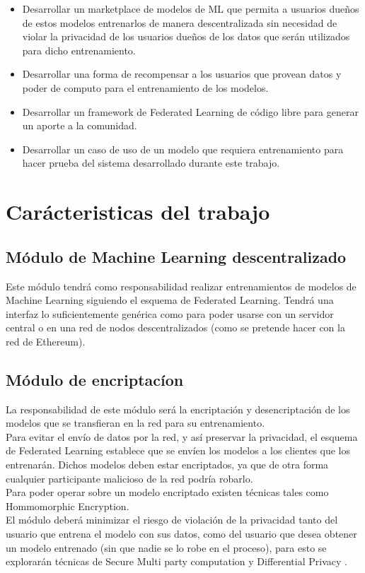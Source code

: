 \documentclass[
11pt, %
oneside, %
spanish, %
singlespacing, %
headsepline, %
chapterinoneline, %
]{MastersDoctoralThesis} %
\begin{document}
\begin{itemize}
\item Desarrollar un marketplace de modelos de ML que permita a usuarios dueños de estos modelos entrenarlos de manera descentralizada sin necesidad de violar la privacidad de los usuarios dueños de los datos que serán utilizados para dicho entrenamiento.  
\item Desarrollar una forma de recompensar a los usuarios que provean datos y poder de computo para el entrenamiento de los modelos.
\item Desarrollar un framework de Federated Learning de código libre para generar un aporte a la comunidad.
\item Desarrollar un caso de uso de un modelo que requiera entrenamiento para hacer prueba del sistema desarrollado durante este trabajo.
\end{itemize}


\chapter{Car\'acteristicas del trabajo}

\section{Módulo de Machine Learning descentralizado}
Este módulo tendrá como responsabilidad realizar entrenamientos de modelos de Machine Learning siguiendo el esquema de Federated Learning. Tendrá una interfaz lo suficientemente genérica como para poder usarse con un servidor central o en una red de nodos descentralizados (como se pretende hacer con la red de Ethereum).

\section{Módulo de encriptac\'ion}
La responsabilidad de este módulo será la encriptación y desencriptación de los modelos que se transfieran en la red para su entrenamiento. \\
Para evitar el envío de datos por la red, y así preservar la privacidad, el esquema de Federated Learning establece que se envíen los modelos a los clientes que los entrenarán.
Dichos modelos deben estar encriptados, ya que de otra forma cualquier participante malicioso de la red podría robarlo. \\
Para poder operar sobre un modelo encriptado existen técnicas tales como Hommomorphic Encryption. \\
El módulo deberá minimizar el riesgo de violación de la privacidad tanto del usuario que entrena el modelo con sus datos, como del usuario que desea obtener un modelo entrenado (sin que nadie se lo robe en el proceso), para esto se explorarán técnicas de  Secure Multi party computation y Differential Privacy \cite{diffpriv1} \cite{diffpriv2}.
\end{document}
